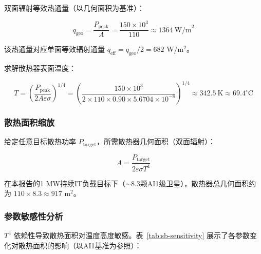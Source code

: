 双面辐射等效热通量（以几何面积为基准）：

\begin{equation}
  q_{\text{geo}} = \frac{P_{\text{peak}}}{A} = \frac{150 \times 10^{3}}{110} \approx 1364\ \text{W/m}^{2}
\end{equation}

该热通量对应单面等效辐射通量 $q_{\text{eff}} = q_{\text{geo}}/2 = 682$ W/m$^2$。

求解散热器表面温度：

\begin{equation}
  T = \left(\frac{P_{\text{peak}}}{2A\varepsilon\sigma}\right)^{1/4}
    = \left(\frac{150 \times 10^{3}}{2 \times 110 \times 0.90 \times 5.6704 \times 10^{-8}}\right)^{1/4}
    \approx 342.5\ \text{K} \approx 69.4^{\circ}\text{C}
  \label{eq:ai1-temperature}
\end{equation}

\subsubsection{散热面积缩放}

给定任意目标散热功率 $P_{\text{target}}$，所需散热器几何面积（双面辐射）：

\begin{equation}
  A = \frac{P_{\text{target}}}{2\varepsilon\sigma T^{4}}
  \label{eq:area-scaling}
\end{equation}

在本报告的1 MW持续IT负载目标下（$\sim$8.3颗AI1级卫星），散热器总几何面积约为 $110 \times 8.3 \approx 917$ m$^2$。

\subsubsection{参数敏感性分析}

$T^{4}$ 依赖性导致散热面积对温度高度敏感。表~\ref{tab:sb-sensitivity} 展示了各参数变化对散热面积的影响（以AI1基准为参照）：

